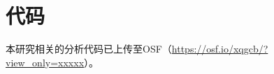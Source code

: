 \chapter{代码\label{chap:codes}}
本研究相关的分析代码已上传至OSF（\href{https://osf.io/xqgcb/?view_only=xxxxx}{https://osf.io/xqgcb/?view\_only=xxxxx}）。
